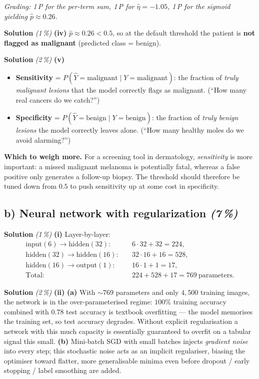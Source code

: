 \documentclass[11pt,a4paper]{article}
\newcommand{\subpoints}[1]{\textit{(#1\,\%)}}
\newcommand{\sol}{\noindent\textbf{Solution}}
\begin{document}
\noindent\emph{Grading: 1\,P for the per-term sum, 1\,P for $\hat\eta = -1.05$, 1\,P for the
sigmoid yielding $\hat p \approx 0.26$.}

\medskip
\sol{} \subpoints{1} \textbf{(iv)} $\hat p \approx 0.26 < 0.5$, so at the default threshold the
patient is \textbf{not flagged as malignant} (predicted class = benign).

\medskip
\sol{} \subpoints{2} \textbf{(v)}
\begin{itemize}
  \item \textbf{Sensitivity} = $P(\hat Y = \text{malignant} \mid Y = \text{malignant})$: the
        fraction of \emph{truly malignant lesions} that the model correctly flags as malignant.
        (``How many real cancers do we catch?'')
  \item \textbf{Specificity} = $P(\hat Y = \text{benign} \mid Y = \text{benign})$: the
        fraction of \emph{truly benign lesions} the model correctly leaves alone. (``How many
        healthy moles do we avoid alarming?'')
\end{itemize}
\textbf{Which to weigh more.} For a screening tool in dermatology, \emph{sensitivity} is more
important: a missed malignant melanoma is potentially fatal, whereas a false positive only
generates a follow-up biopsy. The threshold should therefore be tuned down from $0.5$ to push
sensitivity up at some cost in specificity.

\subsection*{b) Neural network with regularization \subpoints{7}}

\sol{} \subpoints{1} \textbf{(i)} Layer-by-layer:
\begin{align*}
\text{input}(6) \to \text{hidden}(32): &\quad 6\cdot 32 + 32 = 224, \\
\text{hidden}(32) \to \text{hidden}(16): &\quad 32\cdot 16 + 16 = 528, \\
\text{hidden}(16) \to \text{output}(1): &\quad 16\cdot 1 + 1 = 17, \\
\text{Total:} &\quad 224 + 528 + 17 = \boxed{769}\ \text{parameters.}
\end{align*}

\medskip
\sol{} \subpoints{2} \textbf{(ii)} \textbf{(a)} With $\sim 769$ parameters and only $4{,}500$
training images, the network is in the over-parameterised regime: $100\%$ training accuracy
combined with $0.78$ test accuracy is textbook overfitting --- the model memorises the training
set, so test accuracy degrades. Without explicit regularisation a network with this much capacity
is essentially guaranteed to overfit on a tabular signal this small.
\textbf{(b)} Mini-batch SGD with small batches injects \emph{gradient noise} into every step;
this stochastic noise acts as an implicit regulariser, biasing the optimiser toward flatter, more
generalisable minima even before dropout / early stopping / label smoothing are added.
\end{document}

